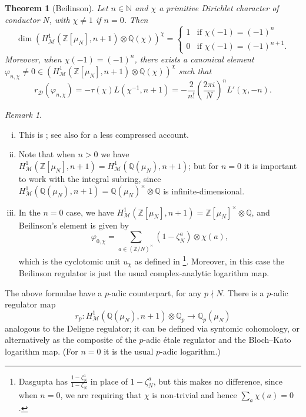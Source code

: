 \documentclass[11pt, a4paper, reqno]{amsart}
\theoremstyle{definition}
\theoremstyle{plain}
\newtheorem{theorem}[definition]{Theorem}
\theoremstyle{remark}
\newtheorem*{remark}{Remark}
\DeclareMathOperator{\mot}{\mathscr{M}}
\newcommand{\numberset}{\mathbb}
\newcommand{\Q}{\numberset{Q}}
\newcommand{\Z}{\numberset{Z}}
\newcommand{\N}{\numberset{N}}
\renewcommand{\phi}{\varphi}
\newcommand{\del}{\mathcal{D}}
\newcommand{\regulator}[1]{r_{#1}}
\newcommand{\rD}{\regulator{\del}}
\begin{document}
  \begin{theorem}[Beilinson]
   \label{thm:deligne-regulator-beilinson-element}
   Let $n \in \N$ and $\chi$ a primitive Dirichlet character of conductor $N$, with $\chi \ne 1$ if $n = 0$. Then
   \[
    \dim(H^1_{\mot}(\Z[\mu_N], n+1)\otimes\Q(\chi))^{\chi} = \begin{cases} 1 &\text{if $\chi(-1) = (-1)^n$} \\ 0 &\text{if $\chi(-1)=(-1)^{n+1}$.} \end{cases}
   \]
   Moreover, when $\chi(-1) = (-1)^n$, there exists a canonical element $\phi_{n, \chi} \ne 0 \in (H^1_{\mot}(\Z[\mu_N], n+1)\otimes \Q(\chi))^{\chi}$ such that
   \begin{equation}
    \label{eq:deligne-regulator-beilinson-element}
     \rD(\phi_{n, \chi}) = - \tau(\chi) L(\chi^{-1}, n+1) = -\frac{2}{n!} \left(\frac{2\pi i}{N}\right)^n L'(\chi, -n).
   \end{equation}
  \end{theorem}

  \begin{remark} \
   \begin{enumerate}[(i)]
    \item This is \cite[Corollary 7.1.6]{beilinson84}; see also \cite{huberwildeshaus} for a less compressed account.
    \item Note that when $n > 0$ we have $H^1_{\mot}(\Z[\mu_N], n+1) = H^1_{\mot}(\Q(\mu_N), n+1)$; but for $n = 0$ it is important to work with the integral subring, since $H^1_{\mot}(\Q(\mu_N), n+1) = \Q(\mu_N)^\times \otimes \Q$ is infinite-dimensional.

    \item In the $n = 0$ case, we have $H^1_{\mot}(\Z[\mu_N], n+1) = \Z[\mu_N]^\times \otimes \Q$, and Beilinson's element is given by
    \[ \varphi_{0, \chi} = \sum_{a \in (\Z / N)^\times} (1 - \zeta_N^a) \otimes \chi(a),\]
    which is the cyclotomic unit $u_\chi$ as defined in \cite[\S 4.1]{Dasgupta-factorization}\footnote{Dasgupta has $\frac{1 - \zeta_N^a}{1 - \zeta_N}$ in place of $1 - \zeta_N^a$, but this makes no difference, since when $n = 0$, we are requiring that $\chi$ is non-trivial and hence $\sum_a \chi(a) = 0$.}.  Moreover, in this case the Beilinson regulator is just the usual complex-analytic logarithm map.
   \end{enumerate}
  \end{remark}

  The above formulae have a $p$-adic counterpart, for any $p \nmid N$. There is a $p$-adic regulator map
  \[ r_p : H^1_{\mot}(\Q(\mu_N), n+1) \otimes \Q_p \to \Q_p(\mu_N) \]
  analogous to the Deligne regulator; it can be defined via syntomic cohomology, or alternatively as the composite of the $p$-adic \'etale regulator and the Bloch--Kato logarithm map. (For $n = 0$ it is the usual $p$-adic logarithm.)
\end{document}
